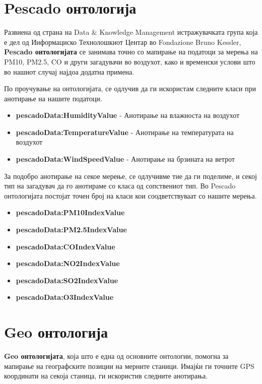 \documentclass{uvamscse}
\begin{document}
\section{Pescado онтологија}

Развиена од страна на Data \& Knowledge Management истражувачката група која е дел од Информациско Технолошкиот Центар во Fondazione Bruno Kessler, \textbf{Pescado онтологијата} се занимава точно со мапирање на податоци за мерења на PM10, PM2.5, CO и други загадувачи во воздухот, како и временски услови што во нашиот случај најдоа додатна примена.
\vspace{5mm}

По проучување на онтологијата, се одлучив да ги искористам следните класи при анотирање на нашите податоци.

\begin{itemize}
\item \textbf{pescadoData:HumidityValue} - Анотирање на влажноста на воздухот 
\item \textbf{pescadoData:TemperatureValue} - Анотирање на температурата на воздухот
\item \textbf{pescadoData:WindSpeedValue} - Анотирање на брзината на ветрот
\end{itemize}

За подобро анотирање на секое мерење, се одлучивме тие да ги поделиме, и секој тип на загадувач да го анотираме со класа од сопствениот тип. Во Pescado онтологијата постојат точен број на класи кои соодветствуваат со нашите мерења.

\begin{itemize}
\item \textbf{pescadoData:PM10IndexValue}
\item \textbf{pescadoData:PM2.5IndexValue}
\item \textbf{pescadoData:COIndexValue}
\item \textbf{pescadoData:NO2IndexValue}
\item \textbf{pescadoData:SO2IndexValue}
\item \textbf{pescadoData:O3IndexValue}
\end{itemize}


\section{Geo онтологија}

\textbf{Geo онтологијата}, која што е една од основните онтологии, помогна за мапирање на географските позиции на мерните станици. Имајќи ги точните GPS координати на секоја станица, ги искористив следните анотирања.
\end{document}
